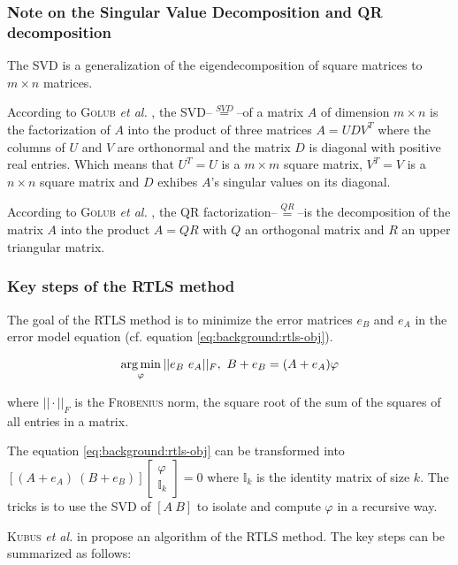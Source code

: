 \documentclass[/home/francois/latex/report/main.tex]{subfiles}
\begin{document}
\subsubsection{Note on the Singular Value Decomposition and QR decomposition}

The \ac{SVD} is a generalization of the eigendecomposition of square matrices to $m \times n$ matrices.

According to \textsc{Golub} \textit{et al.} \cite{Golub1965}, the \ac{SVD}–$\overset{SVD}{=}$–of a matrix $A$ of dimension $m \times n$ is the factorization of $A$ into the product of three matrices $A = UDV^T$ where the columns of $U$ and $V$ are orthonormal and the matrix $D$ is diagonal with positive real entries. Which means that $U^T = U$ is a $m \times m$ square matrix, $V^T = V$ is a $n \times n$ square matrix and $D$ exhibes $A$'s singular values on its diagonal.

According to \textsc{Golub} \textit{et al.} \cite{Golub1996}, the QR factorization–$\overset{QR}{=}$–is the decomposition of the matrix $A$ into the product $A = QR$ with $Q$ an orthogonal matrix and $R$ an upper triangular matrix.

\subsubsection{Key steps of the \ac{RTLS} method}

The goal of the \ac{RTLS} method is to minimize the error matrices $e_B$ and $e_A$ in the error model equation (cf. equation \ref{eq:background:rtls-obj}).

\begin{equation}
  \label{eq:background:rtls-obj}
  \operatorname*{arg\,min}_{\varphi} ||e_B \ e_A||_F, \ B + e_B = (A + e_A) \varphi
\end{equation}

where $|| \cdot ||_F$ is the \textsc{Frobenius} norm, the square root of the sum of the squares of all entries in a matrix.

The equation \ref{eq:background:rtls-obj} can be transformed into $[(A + e_A) \ (B + e_B)]\begin{bmatrix}\varphi \\ \mathbb{I}_k\end{bmatrix} = 0$ where $\mathbb{I}_k$ is the identity matrix of size $k$. The tricks is to use the \ac{SVD} of $[A \ B]$ to isolate and compute $\varphi$ in a recursive way.

\textsc{Kubus} \textit{et al.} in \cite{Kubus2008} propose an algorithm of the \ac{RTLS} method. The key steps can be summarized as follows:
\end{document}
